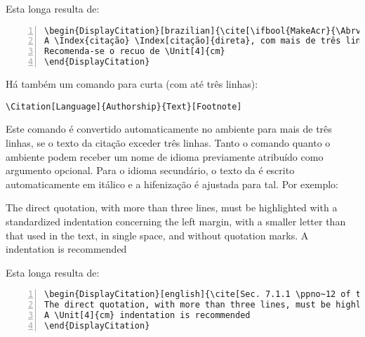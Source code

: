 \noindent Esta   longa resulta de:

\begin{snugshade}
\begin{Verbatim}[numbers = left]
\begin{DisplayCitation}[brazilian]{\cite[\ifbool{MakeAcr}{\Abrv{sec}}{Seç.} 7.1.1 \ppno~12 da \ifbool{MakeAcr}{\intl{NBR}}{NBR} 10520]{ABNT2023NBR10520}}
A \Index{citação} \Index[citação]{direta}, com mais de três linhas, deve ser destacada com recuo padronizado em relação à margem esquerda, com letra menor que a utilizada no texto, em espaço simples e sem aspas.
Recomenda-se o recuo de \Unit[4]{cm}
\end{DisplayCitation}
\end{Verbatim}
\end{snugshade}

Há também um comando para   curta (com até três linhas):

\begin{snugshade}
\begin{Verbatim}
\Citation[Language]{Authorship}{Text}[Footnote]
\end{Verbatim}
\end{snugshade}

\noindent Este comando é convertido automaticamente no ambiente para mais de três linhas, se o texto da citação exceder três linhas.
Tanto o comando quanto o ambiente podem receber um nome de idioma previamente atribuído como argumento opcional.
Para o idioma secundário, o texto da  é escrito automaticamente em itálico e a hifenização é ajustada para tal.
Por exemplo:

\begin{DisplayCitation}[english]{\cite[Sec. 7.1.1 \ppno~12 of the  10520, own translation]{ABNT2023NBR10520}}
The direct quotation, with more than three lines, must be highlighted with a standardized indentation concerning the left margin, with a smaller letter than that used in the text, in single space, and without quotation marks.
A  indentation is recommended
\end{DisplayCitation}

\noindent Esta   longa resulta de:

\begin{snugshade}
\begin{Verbatim}[numbers = left]
\begin{DisplayCitation}[english]{\cite[Sec. 7.1.1 \ppno~12 of the \ifbool{MakeAcr}{\intl{NBR}}{NBR} 10520, own translation]{ABNT2023NBR10520}}
The direct quotation, with more than three lines, must be highlighted with a standardized indentation concerning the left margin, with a smaller letter than that used in the text, in single space, and without quotation marks.
A \Unit[4]{cm} indentation is recommended
\end{DisplayCitation}
\end{Verbatim}
\end{snugshade}

